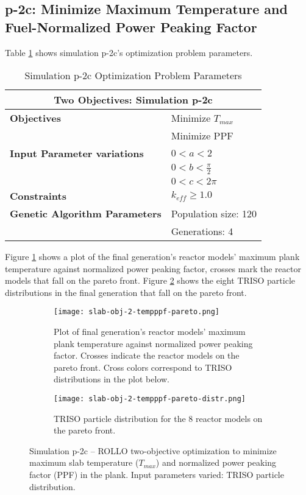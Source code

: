 \subsection{p-2c: Minimize Maximum Temperature and Fuel-Normalized Power Peaking Factor}
Table \ref{tab:simulationp2c} shows simulation p-2c's optimization problem parameters. 
\begin{table}[htbp]
    \centering
    \onehalfspacing
    \caption{Simulation p-2c Optimization Problem Parameters}
	\label{tab:simulationp2c}
    \footnotesize
    \begin{tabular}{l|p{3cm}}
    \hline 
    \multicolumn{2}{c}{\textbf{Two Objectives: Simulation p-2c}} \\
    \hline 
    \textbf{Objectives} & Minimize $T_{max}$ \\
    & Minimize PPF \\
    \hline 
    \textbf{Input Parameter variations} & $0<a<2$ \\
    & $0<b<\frac{\pi}{2}$ \\
    & $0<c<2\pi$ \\
    \hline
    \textbf{Constraints} & $k_{eff} \geq 1.0$\\ 
    \hline 
    \textbf{Genetic Algorithm Parameters} & Population size: 120 \\
    & Generations: 4 \\
    \hline
    \end{tabular}
\end{table}
Figure \ref{fig:slab-obj-2-tempppf-pareto} shows a plot of the final generation's reactor models' 
maximum plank temperature against normalized power peaking factor, crosses mark the reactor 
models that fall on the pareto front.
Figure \ref{fig:slab-obj-2-tempppf-pareto-distr} shows the eight TRISO particle distributions in 
the final generation that fall on the pareto front. 
\begin{figure}[htbp]
    \centering
    \begin{subfigure}{\textwidth}
        \texttt{[image: slab-obj-2-tempppf-pareto.png]}
        \caption{Plot of final generation's reactor models' maximum plank temperature against normalized 
        power peaking factor. Crosses indicate the reactor models on the pareto front. Cross colors 
        correspond to TRISO distributions in the plot below.}
        \label{fig:slab-obj-2-tempppf-pareto} 
    \end{subfigure}
    \begin{subfigure}{\textwidth}
        \texttt{[image: slab-obj-2-tempppf-pareto-distr.png]}
        \caption{TRISO particle distribution for the 8 reactor models on the pareto front.}
        \label{fig:slab-obj-2-tempppf-pareto-distr} 
    \end{subfigure}
    \caption{Simulation p-2c -- ROLLO two-objective optimization to minimize maximum slab temperature 
    ($T_{max}$) and normalized power peaking factor (PPF) in the plank. 
    Input parameters varied: TRISO particle distribution.}
    \label{fig:slab-obj-2-tempppf}
\end{figure}
